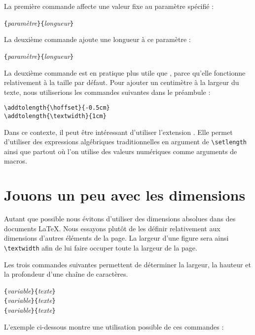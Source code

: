 La première commande affecte une valeur fixe  au paramètre spécifié :
\begin{lscommand}
\verb|{|\emph{paramètre}\verb|}{|\emph{longueur}\verb|}|
\end{lscommand}

La deuxième commande ajoute une longueur à ce paramètre :
\begin{lscommand}
\verb|{|\emph{paramètre}\verb|}{|\emph{longueur}\verb|}|
\end{lscommand} 

La deuxième commande est en pratique plus utile que ,
parce qu'elle fonctionne relativement à la taille
par défaut. Pour ajouter un centimètre à la largeur du texte, nous
utiliserions les commandes suivantes dans le préambule :
\begin{code}
\verb|\addtolength{\hoffset}{-0.5cm}|\\
\verb|\addtolength{\textwidth}{1cm}|
\end{code}

Dans ce contexte, il peut être intéressant d'utiliser l'extension
. Elle permet d'utiliser des expressions algébriques
traditionnelles en argument de \verb|\setlength| ainsi que partout où
l'on utilise des valeurs numériques comme arguments de macros.

\section{Jouons un peu avec les dimensions}

Autant que possible nous évitons d'utiliser des dimensions absolues
dans des documents \LaTeX{}. Nous essayons plutôt de les définir
relativement aux dimensions d'autres éléments de la page. La largeur
d'une figure sera ainsi \verb|\textwidth| afin de lui faire occuper
toute la largeur de la page.

Les trois commandes suivantes permettent de déterminer la largeur, la
hauteur et la profondeur d'une chaîne de caractères.

\begin{lscommand}
\verb|{|\emph{variable}\verb|}{|\emph{texte}\verb|}|\\
\verb|{|\emph{variable}\verb|}{|\emph{texte}\verb|}|\\
\verb|{|\emph{variable}\verb|}{|\emph{texte}\verb|}|
\end{lscommand}

\bigbreak
L'exemple ci-dessous montre une utilisation possible de ces 
commandes : 

